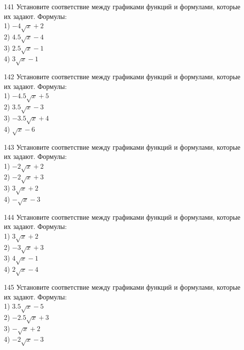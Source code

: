 \documentclass[4apaper]{article}
\begin{document}
\begin{taskBN}{141}
Установите соответствие между графиками функций и формулами, которые их задают. Формулы: \\1) $-4\sqrt{x}+2$\\2) $4.5\sqrt{x}-4$\\3) $2.5\sqrt{x}-1$\\4) $3\sqrt{x}-1$
\end{taskBN}

\begin{taskBN}{142}
Установите соответствие между графиками функций и формулами, которые их задают. Формулы: \\1) $-4.5\sqrt{x}+5$\\2) $3.5\sqrt{x}-3$\\3) $-3.5\sqrt{x}+4$\\4) $\sqrt{x}-6$
\end{taskBN}

\begin{taskBN}{143}
Установите соответствие между графиками функций и формулами, которые их задают. Формулы: \\1) $-2\sqrt{x}+2$\\2) $-2\sqrt{x}+3$\\3) $3\sqrt{x}+2$\\4) $-\sqrt{x}-3$
\end{taskBN}

\begin{taskBN}{144}
Установите соответствие между графиками функций и формулами, которые их задают. Формулы: \\1) $3\sqrt{x}+2$\\2) $-3\sqrt{x}+3$\\3) $4\sqrt{x}-1$\\4) $2\sqrt{x}-4$
\end{taskBN}

\begin{taskBN}{145}
Установите соответствие между графиками функций и формулами, которые их задают. Формулы: \\1) $3.5\sqrt{x}-5$\\2) $-2.5\sqrt{x}+3$\\3) $-\sqrt{x}+2$\\4) $-2\sqrt{x}-3$
\end{taskBN}
\end{document}
